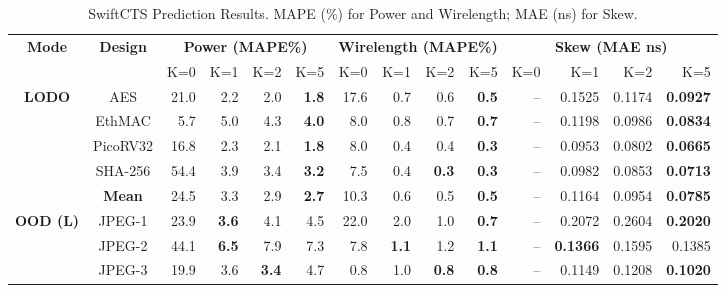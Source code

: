 \documentclass[acmsmall,review,anonymous]{acmart}
\begin{document}
\begin{table}[t]
\centering
\small
\renewcommand{\arraystretch}{1.15}
\setlength{\tabcolsep}{5pt}
\caption{SwiftCTS Prediction Results. MAPE (\%) for Power and Wirelength; MAE (ns) for Skew.}
\label{tab:results}
\begin{tabular}{|c|c|rrrr|rrrr|rrrr|}
\hline
\multirow{2}{*}{\textbf{Mode}} &
\multirow{2}{*}{\textbf{Design}} &
\multicolumn{4}{c|}{\textbf{Power (MAPE\%)}} &
\multicolumn{4}{c|}{\textbf{Wirelength (MAPE\%)}} &
\multicolumn{4}{c|}{\textbf{Skew (MAE ns)}} \\
& & K=0 & K=1 & K=2 & K=5 & K=0 & K=1 & K=2 & K=5 &
    K=0 & K=1 & K=2 & K=5 \\ \hline
\multirow{5}{*}{\textbf{LODO}}
 & AES       & 21.0 & 2.2 & 2.0 & \textbf{1.8} & 17.6 & 0.7 & 0.6 & \textbf{0.5}  & -- & 0.1525 & 0.1174 & \textbf{0.0927} \\
 & EthMAC    &  5.7 & 5.0 & 4.3 & \textbf{4.0} &  8.0 & 0.8 & 0.7 & \textbf{0.7}  & -- & 0.1198 & 0.0986 & \textbf{0.0834} \\
 & \cellcolor{bestrow}PicoRV32 & \cellcolor{bestrow}16.8 & \cellcolor{bestrow}2.3 & \cellcolor{bestrow}2.1 & \cellcolor{bestrow}\textbf{1.8}
   & \cellcolor{bestrow}8.0 & \cellcolor{bestrow}0.4 & \cellcolor{bestrow}0.4 & \cellcolor{bestrow}\textbf{0.3}
   & \cellcolor{bestrow}-- & \cellcolor{bestrow}0.0953 & \cellcolor{bestrow}0.0802 & \cellcolor{bestrow}\textbf{0.0665} \\
 & SHA-256   & 54.4 & 3.9 & 3.4 & \textbf{3.2} &  7.5 & 0.4 & \textbf{0.3} & \textbf{0.3} & -- & 0.0982 & 0.0853 & \textbf{0.0713} \\ \cline{2-14}
 & \textbf{Mean} & 24.5 & 3.3 & 2.9 & \textbf{2.7} & 10.3 & 0.6 & 0.5 & \textbf{0.5} & -- & 0.1164 & 0.0954 & \textbf{0.0785} \\ \hline
\multirow{7}{*}{\textbf{OOD (L)}}
 & JPEG-1    & 23.9 & \textbf{3.6} & 4.1 & 4.5 & 22.0 & 2.0 & 1.0 & \textbf{0.7} & -- & 0.2072 & 0.2604 & \textbf{0.2020} \\
 & JPEG-2    & 44.1 & \textbf{6.5} & 7.9 & 7.3 &  7.8 & \textbf{1.1} & 1.2 & \textbf{1.1} & -- & \textbf{0.1366} & 0.1595 & 0.1385 \\
 & \cellcolor{bestrow}JPEG-3 & \cellcolor{bestrow}19.9 & \cellcolor{bestrow}3.6 & \cellcolor{bestrow}\textbf{3.4} & \cellcolor{bestrow}4.7
   & \cellcolor{bestrow}0.8 & \cellcolor{bestrow}1.0 & \cellcolor{bestrow}\textbf{0.8} & \cellcolor{bestrow}\textbf{0.8}
   & \cellcolor{bestrow}-- & \cellcolor{bestrow}0.1149 & \cellcolor{bestrow}0.1208 & \cellcolor{bestrow}\textbf{0.1020} \\

\end{tabular}
\end{table}
\end{document}
